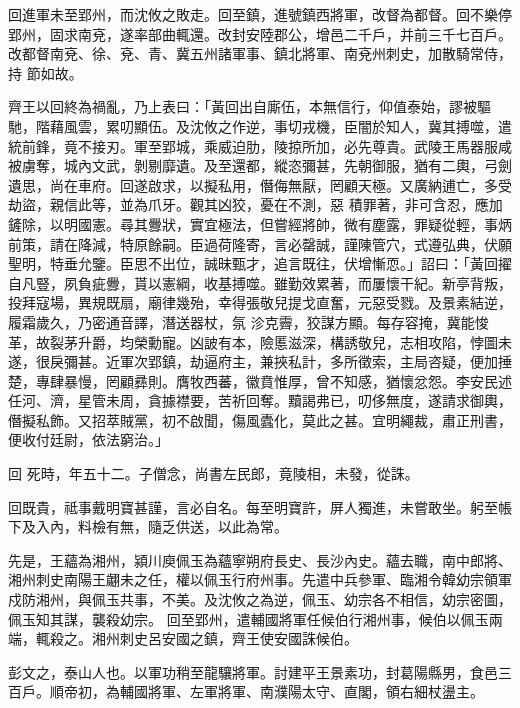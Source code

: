 \begin{pinyinscope}
 回進軍未至郢州，而沈攸之敗走。回至鎮，進號鎮西將軍，改督為都督。回不樂停郢州，固求南兗，遂率部曲輒還。改封安陸郡公，增邑二千戶，并前三千七百戶。改都督南兗、徐、兗、青、冀五州諸軍事、鎮北將軍、南兗州刺史，加散騎常侍，持
 節如故。



 齊王以回終為禍亂，乃上表曰：「黃回出自廝伍，本無信行，仰值泰始，謬被驅馳，階藉風雲，累叨顯伍。及沈攸之作逆，事切戎機，臣闇於知人，冀其搏噬，遣統前鋒，竟不接刃。軍至郢城，乘威迫肋，陵掠所加，必先尊貴。武陵王馬器服咸被虜奪，城內文武，剝剔靡遺。及至還都，縱恣彌甚，先朝御服，猶有二輿，弓劍遺思，尚在車府。回遂啟求，以擬私用，僭侮無厭，罔顧天極。又廣納逋亡，多受劫盜，親信此等，並為爪牙。觀其凶狡，憂在不測，惡
 積罪著，非可含忍，應加鏟除，以明國憲。尋其釁狀，實宜極法，但嘗經將帥，微有塵露，罪疑從輕，事炳前策，請在降減，特原餘嗣。臣過荷隆寄，言必罄誠，謹陳管穴，式遵弘典，伏願聖明，特垂允鑒。臣思不出位，誠昧甄才，追言既往，伏增慚恧。」詔曰：「黃回擢自凡豎，夙負疵釁，貰以憲綱，收基搏噬。雖勤效累著，而屢懷干紀。新亭背叛，投拜寇場，異規既扇，廟律幾殆，幸得張敬兒提戈直奮，元惡受戮。及景素結逆，履霜歲久，乃密通音譯，潛送器杖，氛
 沴克霽，狡謀方顯。每存容掩，冀能悛革，故裂茅升爵，均榮勳寵。凶詖有本，險慝滋深，構誘敬兒，志相攻陷，悖圖未遂，很戾彌甚。近軍次郢鎮，劫逼府主，兼挾私計，多所徵索，主局咨疑，便加捶楚，專肆暴慢，罔顧彞則。膺牧西蕃，徽賁惟厚，曾不知感，猶懷忿怨。李安民述任河、濟，星管未周，貪據襟要，苦祈回奪。黷謁弗已，叨侈無度，遂請求御輿，僭擬私飾。又招萃賊黨，初不啟聞，傷風蠹化，莫此之甚。宜明繩裁，肅正刑書，便收付廷尉，依法窮治。」



 回
 死時，年五十二。子僧念，尚書左民郎，竟陵相，未發，從誅。



 回既貴，祗事戴明寶甚謹，言必自名。每至明寶許，屏人獨進，未嘗敢坐。躬至帳下及入內，料檢有無，隨乏供送，以此為常。



 先是，王蘊為湘州，潁川庾佩玉為蘊寧朔府長史、長沙內史。蘊去職，南中郎將、湘州刺史南陽王翽未之任，權以佩玉行府州事。先遣中兵參軍、臨湘令韓幼宗領軍戍防湘州，與佩玉共事，不美。及沈攸之為逆，佩玉、幼宗各不相信，幼宗密圖，佩玉知其謀，襲殺幼宗。
 回至郢州，遣輔國將軍任候伯行湘州事，候伯以佩玉兩端，輒殺之。湘州刺史呂安國之鎮，齊王使安國誅候伯。



 彭文之，泰山人也。以軍功稍至龍驤將軍。討建平王景素功，封葛陽縣男，食邑三百戶。順帝初，為輔國將軍、左軍將軍、南濮陽太守、直閣，領右細杖盪主。




\end{pinyinscope}
